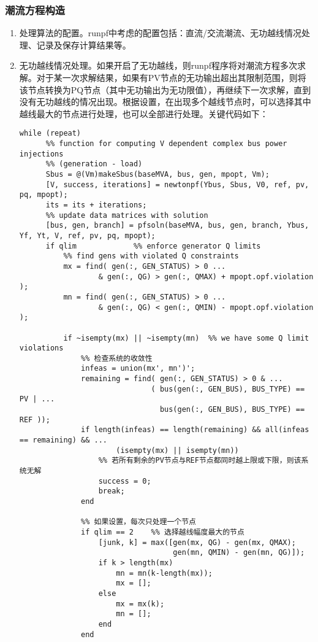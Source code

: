 \documentclass[a4paper,12pt]{article}
\begin{document}
    \subsubsection{潮流方程构造}
    \begin{enumerate}
      \item 处理算法的配置。runpf中考虑的配置包括：直流/交流潮流、无功越线情况处理、记录及保存计算结果等。
      \item 无功越线情况处理。如果开启了无功越线，则runpf程序将对潮流方程多次求解。对于某一次求解结果，如果有PV节点的无功输出超出其限制范围，则将该节点转换为PQ节点（其中无功输出为无功限值），再继续下一次求解，直到没有无功越线的情况出现。根据设置，在出现多个越线节点时，可以选择其中越线最大的节点进行处理，也可以全部进行处理。关键代码如下：
      \begin{lstlisting}[style=Matlab-editor,basicstyle=\mlttfamily]
while (repeat)
      %% function for computing V dependent complex bus power injections
      %% (generation - load)
      Sbus = @(Vm)makeSbus(baseMVA, bus, gen, mpopt, Vm);
      [V, success, iterations] = newtonpf(Ybus, Sbus, V0, ref, pv, pq, mpopt);
      its = its + iterations;
      %% update data matrices with solution
      [bus, gen, branch] = pfsoln(baseMVA, bus, gen, branch, Ybus, Yf, Yt, V, ref, pv, pq, mpopt);
      if qlim             %% enforce generator Q limits
          %% find gens with violated Q constraints
          mx = find( gen(:, GEN_STATUS) > 0 ...
                  & gen(:, QG) > gen(:, QMAX) + mpopt.opf.violation );
          mn = find( gen(:, GEN_STATUS) > 0 ...
                  & gen(:, QG) < gen(:, QMIN) - mpopt.opf.violation );

          if ~isempty(mx) || ~isempty(mn)  %% we have some Q limit violations
              %% 检查系统的收敛性
              infeas = union(mx', mn')';
              remaining = find( gen(:, GEN_STATUS) > 0 & ...
                              ( bus(gen(:, GEN_BUS), BUS_TYPE) == PV | ...
                                bus(gen(:, GEN_BUS), BUS_TYPE) == REF ));
              if length(infeas) == length(remaining) && all(infeas == remaining) && ...
                      (isempty(mx) || isempty(mn))
                  %% 若所有剩余的PV节点与REF节点都同时越上限或下限，则该系统无解
                  success = 0;
                  break;
              end

              %% 如果设置，每次只处理一个节点
              if qlim == 2    %% 选择越线幅度最大的节点
                  [junk, k] = max([gen(mx, QG) - gen(mx, QMAX);
                                   gen(mn, QMIN) - gen(mn, QG)]);
                  if k > length(mx)
                      mn = mn(k-length(mx));
                      mx = [];
                  else
                      mx = mx(k);
                      mn = [];
                  end
              end


\end{lstlisting}
\end{enumerate}
\end{document}
